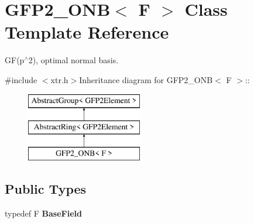 \hypertarget{class_g_f_p2___o_n_b}{
\section{GFP2\_\-ONB$<$ F $>$ Class Template Reference}
\label{class_g_f_p2___o_n_b}
}


GF(p$^\wedge$2), optimal normal basis.  


{\ttfamily \#include $<$xtr.h$>$}Inheritance diagram for GFP2\_\-ONB$<$ F $>$::\begin{figure}[H]
\begin{center}
\leavevmode
\includegraphics[height=3cm]{class_g_f_p2___o_n_b}
\end{center}
\end{figure}
\subsection*{Public Types}
\begin{DoxyCompactItemize}
\item 
\hypertarget{class_g_f_p2___o_n_b_ad3bffbe1a6c331daf56bb6ec51cbc294}{
typedef F {\bfseries BaseField}}
\label{class_g_f_p2___o_n_b_ad3bffbe1a6c331daf56bb6ec51cbc294}

\end{DoxyCompactItemize}
